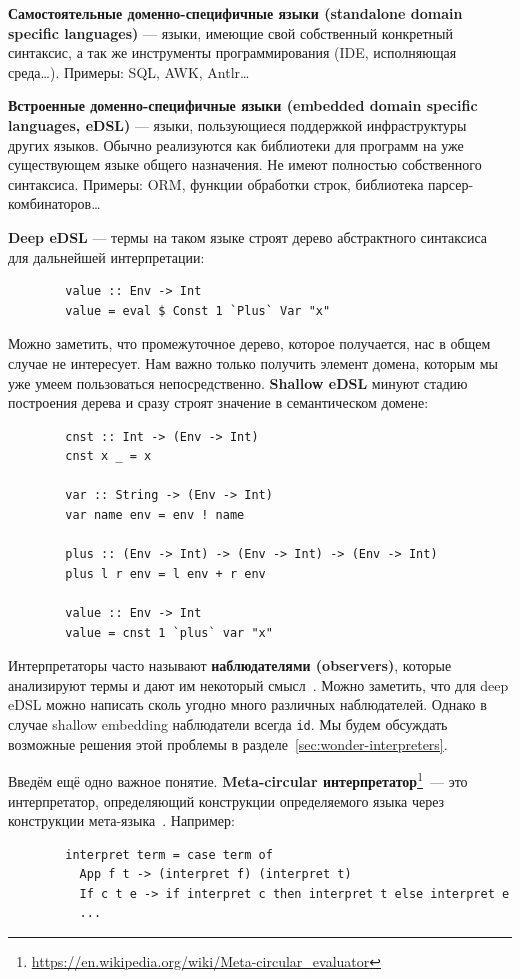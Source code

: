 \documentclass[12pt]{article}
\newcommand{\vocab}[1]{\textbf{#1}} %
\begin{document}
    \vocab{Самостоятельные доменно-специфичные языки (standalone domain specific languages)} --- языки, имеющие свой собственный конкретный синтаксис, а так же инструменты программирования (IDE, исполняющая среда\ldots).
    Примеры: SQL, AWK, Antlr\ldots

    \vocab{Встроенные доменно-специфичные языки (embedded domain specific languages, eDSL)} --- языки, пользующиеся поддержкой инфраструктуры других языков.
    Обычно реализуются как библиотеки для программ на уже существующем языке общего назначения.
    Не имеют полностью собственного синтаксиса.
    Примеры: ORM, функции обработки строк, библиотека парсер-комбинаторов\ldots

    \vocab{Deep eDSL} --- термы на таком языке строят дерево абстрактного синтаксиса для дальнейшей интерпретации:
    \begin{verbatim}
        value :: Env -> Int
        value = eval $ Const 1 `Plus` Var "x"
    \end{verbatim}

    Можно заметить, что промежуточное дерево, которое получается, нас в общем случае не интересует.
    Нам важно только получить элемент домена, которым мы уже умеем пользоваться непосредственно.
    \vocab{Shallow eDSL} минуют стадию построения дерева и сразу строят значение в семантическом домене:
    \begin{verbatim}
        cnst :: Int -> (Env -> Int)
        cnst x _ = x

        var :: String -> (Env -> Int)
        var name env = env ! name

        plus :: (Env -> Int) -> (Env -> Int) -> (Env -> Int)
        plus l r env = l env + r env

        value :: Env -> Int
        value = cnst 1 `plus` var "x"
    \end{verbatim}

    Интерпретаторы часто называют \vocab{наблюдателями (observers)}, которые анализируют термы и дают им некоторый смысл~\cite{gibbons2013functional}.
    Можно заметить, что для deep eDSL можно написать сколь угодно много различных наблюдателей.
    Однако в случае shallow embedding наблюдатели всегда \texttt{id}.
    Мы будем обсуждать возможные решения этой проблемы в разделе~\ref{sec:wonder-interpreters}.

    Введём ещё одно важное понятие.
    \vocab{Meta-circular интерпретатор}\footnote{\url{https://en.wikipedia.org/wiki/Meta-circular_evaluator}}~--- это интерпретатор, определяющий конструкции определяемого языка через конструкции мета-языка~\cite{reynolds1972definitional}.
    Например:
    \begin{verbatim}
        interpret term = case term of
          App f t -> (interpret f) (interpret t)
          If c t e -> if interpret c then interpret t else interpret e
          ...
    \end{verbatim}
\end{document}
